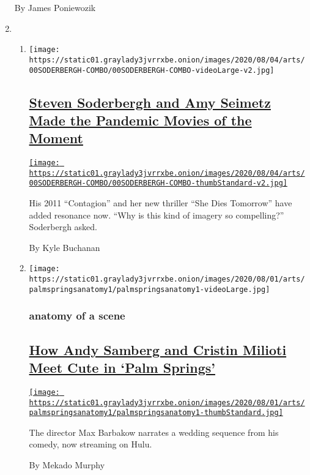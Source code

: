 \begin{enumerate}
  By James Poniewozik
\item
  \begin{enumerate}
  \def\labelenumii{\arabic{enumii}.}
  \item
    \texttt{[image: https://static01.graylady3jvrrxbe.onion/images/2020/08/04/arts/00SODERBERGH-COMBO/00SODERBERGH-COMBO-videoLarge-v2.jpg]}

    \hypertarget{steven-soderbergh-and-amy-seimetz-made-the-pandemic-movies-of-the-moment}{%
    \subsection{\texorpdfstring{\href{/2020/07/31/movies/steven-soderbergh-amy-seimetz-pandemic.html}{Steven
    Soderbergh and Amy Seimetz Made the Pandemic Movies of the
    Moment}}{Steven Soderbergh and Amy Seimetz Made the Pandemic Movies of the Moment}}\label{steven-soderbergh-and-amy-seimetz-made-the-pandemic-movies-of-the-moment}}

    \href{/2020/07/31/movies/steven-soderbergh-amy-seimetz-pandemic.html}{\texttt{[image: https://static01.graylady3jvrrxbe.onion/images/2020/08/04/arts/00SODERBERGH-COMBO/00SODERBERGH-COMBO-thumbStandard-v2.jpg]}}

    His 2011 ``Contagion'' and her new thriller ``She Dies Tomorrow''
    have added resonance now. ``Why is this kind of imagery so
    compelling?'' Soderbergh asked.

    By Kyle Buchanan
  \item
    \texttt{[image: https://static01.graylady3jvrrxbe.onion/images/2020/08/01/arts/palmspringsanatomy1/palmspringsanatomy1-videoLarge.jpg]}

    \hypertarget{anatomy-of-a-scene}{%
    \subsubsection{anatomy of a scene}\label{anatomy-of-a-scene}}

    \hypertarget{how-andy-samberg-and-cristin-milioti-meet-cute-in-palm-springs}{%
    \subsection{\texorpdfstring{\href{/2020/07/31/movies/palm-springs-clip-hulu.html}{How
    Andy Samberg and Cristin Milioti Meet Cute in `Palm
    Springs'}}{How Andy Samberg and Cristin Milioti Meet Cute in `Palm Springs'}}\label{how-andy-samberg-and-cristin-milioti-meet-cute-in-palm-springs}}

    \href{/2020/07/31/movies/palm-springs-clip-hulu.html}{\texttt{[image: https://static01.graylady3jvrrxbe.onion/images/2020/08/01/arts/palmspringsanatomy1/palmspringsanatomy1-thumbStandard.jpg]}}

    The director Max Barbakow narrates a wedding sequence from his
    comedy, now streaming on Hulu.

    By Mekado Murphy
  \end{enumerate}
\end{enumerate}

